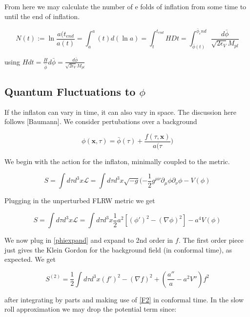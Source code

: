 \documentclass[a4paper,11pt]{article}
\renewcommand{\v}[1]{\mathbf{#1}}
\newcommand{\Mp}{M_{pl}}
\newcommand{\half}{\frac{1}{2}}
\newcommand{\bphi}{\bar{\phi}}
\begin{document}
From here we may calculate the number of e folds of inflation from some time to until the end of inflation. 

\begin{equation}
N(t) := \ln{\frac{a(t_{end}}{a(t)}} = \int_a^a(t) d(\ln{a}) = \int_t^{t_{end}} HDt = \int_{\bphi(t)}^{\bphi_end} \frac{d\bphi}{\sqrt{2\epsilon_V}\Mp}
\label{efolds}
\end{equation}

using $Hdt=\frac{H}{\dot{\bphi}}d\bphi=\frac{d\bphi}{\sqrt{2\epsilon_V}\Mp}$

\subsection{Quantum Fluctuations to $\phi$}

If the inflaton can vary in time, it can also vary in space. The discussion here follows [Baumann]. We consider pertubations over a background

\begin{equation}
\phi(\v{x},\tau) = \bphi(\tau) + \frac{f(\tau, \v{x})}{a(\tau})
\label{phiexpand}
\end{equation}

We begin with the action for the inflaton, minimally coupled to the metric.

\begin{equation}
S =\int d\tau d^3x \mathcal{L}  =  \int d\tau d^3x \sqrt{-g} (-\half g^{\mu \nu}\partial_\mu \phi\partial_\nu \phi - V(\phi)  
\end{equation}

Plugging in the unperturbed FLRW metric we get 


\begin{equation}
S = \int d\tau d^3x \mathcal{L}  = \int d\tau d^3x \half a^2 [(\phi ' )^2 -(\nabla \phi)^2]-a^4V(\phi)
\label{scalarfieldaction}
\end{equation}

We now plug in \ref{phiexpand} and expand to 2nd order in $f$. The first order piece just gives the Klein Gordon for the background field (in conformal time), as expected. We get

\begin{equation}
S^{(2)} = \half \int d\tau d^3x (f')^2 - (\nabla f)^2 + (\frac{a''}{a}-a^2V'')f^2
\end{equation}

after integrating by parts and making use of \ref{F2} in conformal time. In the slow roll approximation we may drop the potential term since:
\end{document}

